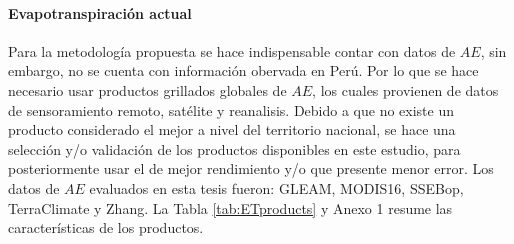 \documentclass[12pt]{article}
\begin{document}


\clearpage

\paragraph{Evapotranspiración actual}\mbox{}

Para la metodología propuesta se hace indispensable contar con datos de $AE$, sin embargo, no se cuenta con información obervada en Perú. Por lo que se hace necesario usar productos grillados globales de $AE$, los cuales provienen de datos de sensoramiento remoto, satélite y reanalisis. Debido a que no existe un producto considerado el mejor a nivel del territorio nacional, se hace una selección y/o validación de los productos disponibles en este estudio, para posteriormente usar el de mejor rendimiento y/o que presente menor error. Los datos de $AE$ evaluados en esta tesis fueron: GLEAM, MODIS16, SSEBop, TerraClimate y Zhang. La Tabla \ref{tab:ETproducts} y Anexo 1 resume las características de los productos.
\end{document}
